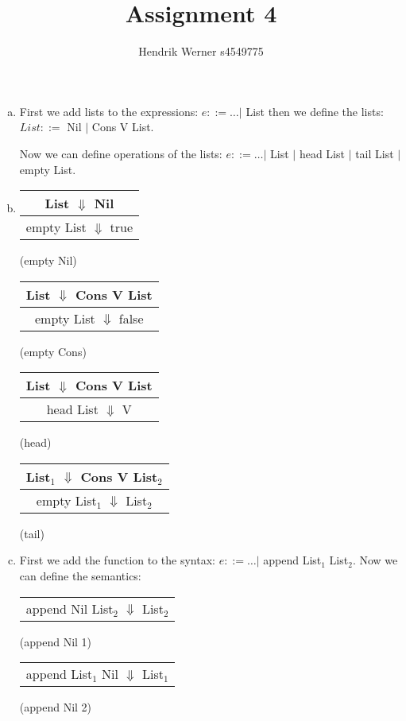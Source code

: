 \documentclass[12pt, a4paper]{article}
\title{Assignment 4}
\author{Hendrik Werner s4549775}
\begin{document}
\maketitle

\section{} %

\section{} %
\begin{enumerate}[(a)]
	\item %
	First we add lists to the expressions:
	$e ::= \dots |$ List
	then we define the lists:
	$List ::=$ Nil $|$ Cons V List.

	Now we can define operations of the lists: $e ::= \dots |$ List $|$ head List $|$ tail List $|$ empty List.
	\item %
	\begin{tabular}{c}
		List $\Downarrow$ Nil
		\\\hline
		empty List $\Downarrow$ true
	\end{tabular}
	(empty Nil)

	\begin{tabular}{c}
		List $\Downarrow$ Cons V List
		\\\hline
		empty List $\Downarrow$ false
	\end{tabular}
	(empty Cons)

	\begin{tabular}{c}
		List $\Downarrow$ Cons V List
		\\\hline
		head List $\Downarrow$ V
	\end{tabular}
	(head)

	\begin{tabular}{c}
		List$_1$ $\Downarrow$ Cons V List$_2$
		\\\hline
		empty List$_1$ $\Downarrow$ List$_2$
	\end{tabular}
	(tail)
	\item %
	First we add the function to the syntax: $e::= \dots |$ append List$_1$ List$_2$. Now we can define the semantics:

	\begin{tabular}{c}
		\\\hline
		append Nil List$_2$ $\Downarrow$ List$_2$
	\end{tabular}
	(append Nil 1)

	\begin{tabular}{c}
		\\\hline
		append List$_1$ Nil $\Downarrow$ List$_1$
	\end{tabular}
	(append Nil 2)


\end{enumerate}
\end{document}
